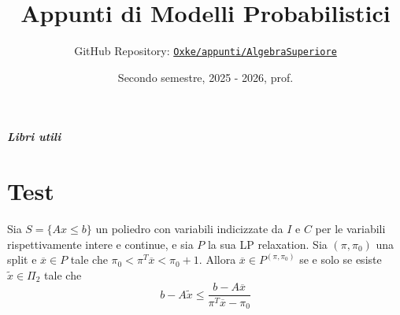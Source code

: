 

\title{Appunti di Modelli Probabilistici}
\author{GitHub Repository:
\href{https://github.com/Oxke/appunti/tree/main/AlgebraSuperiore}{\texttt{Oxke/appunti/AlgebraSuperiore}}}

\date{Secondo semestre, 2025 \-- 2026, prof.}


\maketitle
\paragraph{Libri utili}

\tableofcontents



\chapter{Test}

\begin{theorem}{}
    Sia \(S = \{Ax \le b\} \) un poliedro con variabili indicizzate da \(I\) e \(C\) per le
    variabili rispettivamente intere e continue, e sia \(P\) la sua LP
    relaxation.
    Sia \({(\pi, \pi_{0})}\) una split e \(\overline{x} \in P\) tale che \(\pi_{0} <
    \pi^{T}\overline{x} < \pi_{0} + 1\). Allora \(\overline{x} \in P^{{(\pi,
    \pi_{0})}}\) se e solo se esiste \(\tilde{x} \in \Pi_2 \) tale che 
    \[
     b - A\tilde{x} \le \frac{b - A\overline{x}}{\pi^{T}\overline{x} - \pi_{0}} 
    \]
\end{theorem}

